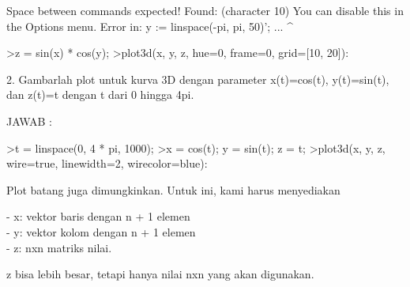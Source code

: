 \documentclass{article}
\begin{document}
\begin{eulernotebook}
\begin{eulercomment}
\begin{eulercomment}
\begin{eulercomment}
\begin{eulercomment}
\begin{eulercomment}
\begin{eulercomment}
\begin{eulercomment}
\begin{eulercomment}
\begin{eulercomment}
\begin{eulercomment}
\begin{euleroutput}
  Space between commands expected!
  Found: 
   (character 10)
  You can disable this in the Options menu.
  Error in:
  y := linspace(-pi, pi, 50)';
   ...
                              ^
\end{euleroutput}
\begin{eulerprompt}
>z = sin(x) * cos(y);
>plot3d(x, y, z, hue=0, frame=0, grid=[10, 20]):
\end{eulerprompt}
\begin{eulercomment}
2. Gambarlah plot untuk kurva 3D dengan parameter x(t)=cos(t),
y(t)=sin(t), dan z(t)=t dengan t dari 0 hingga 4pi.

JAWAB :
\end{eulercomment}
\begin{eulerprompt}
>t = linspace(0, 4 * pi, 1000);
>x = cos(t); y = sin(t); z = t;
>plot3d(x, y, z, wire=true, linewidth=2, wirecolor=blue):
\end{eulerprompt}
\eulersubheading{}
\begin{eulercomment}
\begin{eulercomment}
\begin{eulercomment}
Plot batang juga dimungkinkan. Untuk ini, kami harus menyediakan

- x: vektor baris dengan n + 1 elemen\\
- y: vektor kolom dengan n + 1 elemen\\
- z: nxn matriks nilai.

z bisa lebih besar, tetapi hanya nilai nxn yang akan digunakan.


\end{eulercomment}
\end{eulercomment}
\end{eulercomment}
\end{eulercomment}
\end{eulercomment}
\end{eulercomment}
\end{eulercomment}
\end{eulercomment}
\end{eulercomment}
\end{eulercomment}
\end{eulercomment}
\end{eulercomment}
\end{eulercomment}
\end{eulernotebook}
\end{document}
